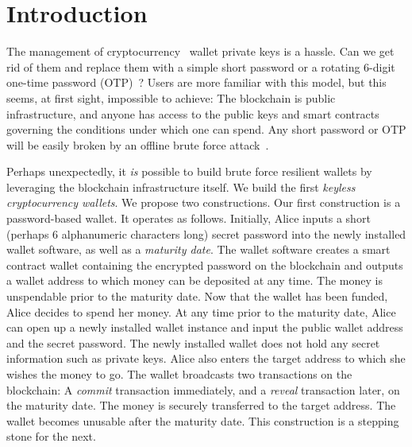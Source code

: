 \section{Introduction}

The management of cryptocurrency~\cite{bitcoin} wallet
private keys is a hassle.
Can we get rid of them and replace them with a simple short password or
a rotating $6$-digit one-time password (OTP)~\cite{rfc6238,rfc4226}? Users are more familiar with this
model, but this seems, at first sight, impossible to achieve:
The blockchain is public infrastructure, and anyone has access to the
public keys and smart contracts~\cite{buterin,wood} governing the conditions under which
one can spend. Any short password or OTP will be easily broken by an offline
brute force attack~\cite{brain-drain}.

Perhaps unexpectedly, it \emph{is} possible to build brute force resilient wallets
by leveraging the blockchain infrastructure itself.
We build the first \emph{keyless cryptocurrency wallets}.
We propose two constructions. Our first construction is a password-based wallet.
It operates as follows.
Initially, Alice inputs a short (perhaps $6$ alphanumeric characters long) secret password into
the newly installed wallet software, as well as a \emph{maturity date}. The wallet software creates
a smart contract wallet containing the encrypted password on
the blockchain and outputs a wallet address to which money can be deposited at any time.
The money is unspendable prior to the maturity date.
Now that the wallet has been funded, Alice decides to spend her money.
At any time prior to the maturity date, Alice
can open up a newly installed wallet instance and input the public wallet address and the
secret password. The newly installed wallet does not hold any secret information such as
private keys. Alice also enters the target address to which she wishes the money to go.
The wallet broadcasts two transactions on the blockchain: A \emph{commit} transaction immediately,
and a \emph{reveal} transaction later, on the maturity date. The money is securely transferred to
the target address. The wallet becomes unusable after the maturity date. This construction
is a stepping stone for the next.

